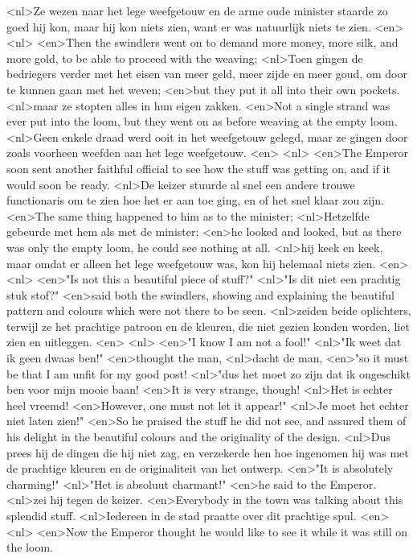 <nl>Ze wezen naar het lege weefgetouw en de arme oude minister staarde zo goed hij kon, maar hij kon niets zien, want er was natuurlijk niets te zien.
<en>
<nl>
<en>Then the swindlers went on to demand more money, more silk, and more gold, to be able to proceed with the weaving;
<nl>Toen gingen de bedriegers verder met het eisen van meer geld, meer zijde en meer goud, om door te kunnen gaan met het weven;
<en>but they put it all into their own pockets.
<nl>maar ze stopten alles in hun eigen zakken.
<en>Not a single strand was ever put into the loom, but they went on as before weaving at the empty loom.
<nl>Geen  enkele draad werd ooit in het weefgetouw gelegd, maar ze gingen door zoals voorheen weefden aan het lege weefgetouw.
<en>
<nl>
<en>The Emperor soon sent another faithful official to see how the stuff was getting on, and if it would soon be ready.
<nl>De keizer stuurde al snel een andere trouwe functionaris om te zien hoe het er aan toe ging, en of het snel klaar zou zijn.
<en>The same thing happened to him as to the minister;
<nl>Hetzelfde gebeurde met hem als met de minister;
<en>he looked and looked, but as there was only the empty loom, he could see nothing at all.
<nl>hij keek en keek, maar omdat er alleen het lege weefgetouw was, kon hij helemaal niets zien.
<en>
<nl>
<en>"Is not this a beautiful piece of stuff?"
<nl>"Is dit niet een prachtig stuk stof?"
<en>said both the swindlers, showing and explaining the beautiful pattern and colours which were not there to be seen.
<nl>zeiden beide oplichters, terwijl ze het prachtige patroon en de kleuren, die niet gezien konden worden, liet zien en uitleggen.
<en>
<nl>
<en>"I know I am not a fool!"
<nl>"Ik weet dat ik geen dwaas ben!"
<en>thought the man,
<nl>dacht de man,
<en>"so it must be that I am unfit for my good post!
<nl>"dus het moet zo zijn dat ik ongeschikt ben voor mijn mooie baan!
<en>It is very strange, though!
<nl>Het is echter heel vreemd!
<en>However, one must not let it appear!"
<nl>Je moet het echter niet laten zien!"
<en>So he praised the stuff he did not see, and assured them of his delight in the beautiful colours and the originality of the design.
<nl>Dus prees hij de dingen die hij niet zag, en verzekerde hen hoe ingenomen hij was met  de prachtige kleuren en de originaliteit van het ontwerp.
<en>"It is absolutely charming!"
<nl>"Het is absoluut charmant!"
<en>he said to the Emperor.
<nl>zei hij tegen de keizer.
<en>Everybody in the town was talking about this splendid stuff.
<nl>Iedereen in de stad praatte over dit prachtige spul.
<en>
<nl>
<en>Now the Emperor thought he would like to see it while it was still on the loom.
